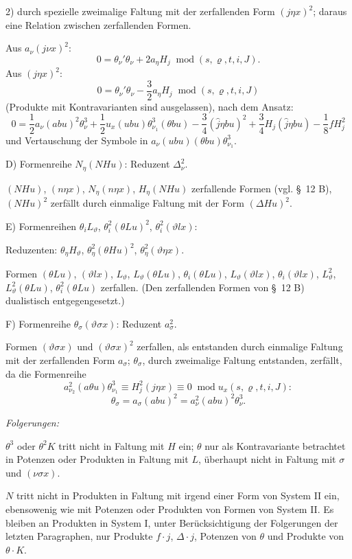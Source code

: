 \documentclass[11pt]{article}
\newcommand{\A}{\Delta}
\newcommand{\R}{\varrho}
\newcommand{\modu}[1]{\;\operatorname{mod} #1}
\begin{document}
2) durch spezielle zweimalige Faltung mit der zerfallenden Form $(j\eta x)^2$; daraus eine Relation zwischen zerfallenden Formen.

Aus $a_\nu(j\nu x)^2$:
\[
0=\theta_\nu'\theta_\nu+2a_\eta H_j\modu{(s,\R,t,i,J)}.
\]
Aus $(j\eta x)^2$:
\[
0=\theta_\nu'\theta_\nu-\frac32a_\eta H_j\modu{(s,\R,t,i,J)}
\]
(Produkte mit Kontravarianten sind ausgelassen), nach dem Ansatz:
\[
0=\frac12a_\nu(abu)^2\theta_\nu^3
+\frac12u_x(ubu)\theta_{\nu_1}^3(\theta bu)
-\frac34(\widehat{j}\eta bu)^2+\frac34H_j(\widehat{j}\eta bu)
-\frac18fH_j^2
\]
und Vertauschung der Symbole in $a_\nu(ubu)(\theta bu)\theta_{\nu_1}^3$.

\noindent D) Formenreihe $N_\eta(NHu)$: Reduzent $\A_\nu^2$.

$(NHu)$, $(n\eta x)$, $N_\eta(n\eta x)$, $H_\eta(NHu)$ zerfallende Formen (vgl. \S\ 12 B), $(NHu)^2$ zerfällt durch einmalige Faltung mit der Form $(\A Hu)^2$.

\noindent E) Formenreihen $\theta_iL_\vartheta$, $\theta_i^2(\theta Lu)^2$, $\theta_i^2(\vartheta lx)$:

Reduzenten: $\theta_\eta H_\vartheta$, $\theta_\eta^2(\theta Hu)^2$, $\theta_\eta^2(\vartheta\eta x)$.

Formen $(\theta Lu)$, $(\vartheta lx)$, $L_\vartheta$, $L_\vartheta(\theta Lu)$, $\theta_i(\theta Lu)$, $L_\vartheta(\vartheta lx)$, $\theta_i(\vartheta lx)$, $L_\vartheta^2$, $L_\vartheta^2(\theta Lu)$, $\theta_i^2(\theta Lu)$ zerfallen. (Den zerfallenden Formen von \S\ 12 B) dualistisch entgegengesetzt.)

\noindent F) Formenreihe $\theta_\sigma(\vartheta\sigma x)$: Reduzent $a_\sigma^2$.

Formen $(\vartheta\sigma x)$ und $(\vartheta\sigma x)^2$ zerfallen, als entstanden durch einmalige Faltung mit der zerfallenden Form $a_\sigma$; $\theta_\sigma$, durch zweimalige Faltung entstanden, zerfällt, da die Formenreihe
\[
a_{\nu_2}^2(a\theta u)\theta_{\nu_1}^3\equiv H_j^2(j\eta x)\equiv0\modu{u_x(s,\R,t,i,J)}:
\]
\[
\theta_\sigma=a_\sigma(abu)^2=a_\nu^2(abu)^2\theta_\nu^3.
\]

\noindent\emph{Folgerungen:}

$\theta^3$ oder $\theta^2K$ tritt nicht in Faltung mit $H$ ein; $\theta$ nur als Kontravariante betrachtet in Potenzen oder Produkten in Faltung mit $L$, überhaupt nicht in Faltung mit $\sigma$ und $(\nu\sigma x)$.

$N$ tritt nicht in Produkten in Faltung mit irgend einer Form von System II ein, ebensowenig wie mit Potenzen oder Produkten von Formen von System II. Es bleiben an Produkten in System I, unter Berücksichtigung der Folgerungen der letzten Paragraphen, nur Produkte $f\cdot j$, $\A\cdot j$, Potenzen von $\theta$ und Produkte von $\theta\cdot K$.
\end{document}
